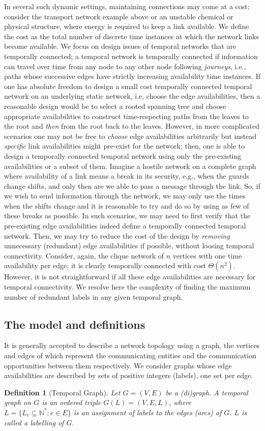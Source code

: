 \documentclass[a4paper,UKenglish]{article}
\newtheorem{definition}{Definition}
\begin{document}
In several such dynamic settings, maintaining connections may come at a cost; consider the transport network example above or an unstable chemical or physical structure, where energy is required to keep a link available. We define the cost as the total number of discrete time instances at which the network links become available. We focus on design issues of temporal networks that are temporally connected; a temporal network is temporally connected if information can travel over time from any node to any other node following \emph{journeys}, i.e., paths whose successive edges have strictly increasing availability time instances. If one has absolute freedom to design a small cost temporally connected temporal network on an underlying static network, i.e, choose the edge availabilities, then a reasonable design would be to select a rooted spanning tree and choose appropriate availabilities to construct time-respecting paths from the leaves to the root and \emph{then} from the root back to the leaves. However, in more complicated scenarios one may not be free to \emph{choose} edge availabilities arbitrarily but instead \emph{specific} link availabilities might pre-exist for the network; then, one is able to design a temporally connected temporal network using only the pre-existing availabilities or a subset of them. Imagine a hostile network on a complete graph where availability of a link means a break in its security, e.g., when the guards change shifts, and only then are we able to pass a message through the link. So, if we wish to send information through the network, we may only use the times when the shifts change and it is reasonable to try and do so by using as few of these breaks as possible. In such scenarios, we may need to first verify that the pre-existing edge availabilities indeed define a temporally connected temporal network. Then, we may try to reduce the cost of the design by \emph{removing} unnecessary (redundant) edge availabilities if possible, without loosing temporal connectivity. Consider, again, the clique network of $n$ vertices with one time availability per edge; it is clearly temporally connected with cost $\Theta(n^2)$. However, it is not straightforward if all these edge availabilities are necessary for temporal connectivity. We resolve here the complexity of finding the maximum number of redundant labels in any given temporal graph.

\subsection{The model and definitions}
It is generally accepted to describe a network topology using a graph, the vertices and edges of which represent the communicating entities and the communication opportunities between them respectively. We consider graphs whose edge availabilities are described by sets of positive integers (labels), one set per edge.
\begin{definition}[Temporal Graph]
Let $G=(V,E)$ be a (di)graph. A temporal graph on $G$ is an ordered triple $G(L)=(V,E,L)$, where $L=\{L_{e} \subseteq \mathbb{N^*}:e\in E\}$ is an \emph{assignment} of labels to the edges (arcs) of $G$. $L$ is called a \emph{labelling} of $G$.
\end{definition}
\end{document}
